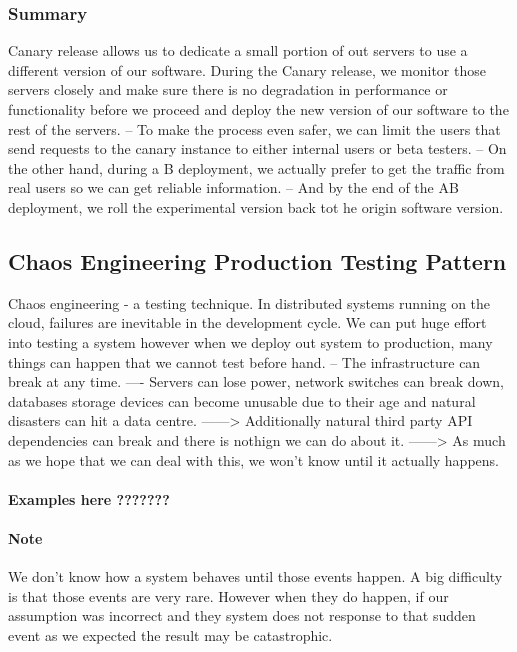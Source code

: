 \documentclass[a4paper, 11pt]{book}
\begin{document}
    \subsubsection{Summary}
    Canary release allows us to dedicate a small portion of out servers to use a different version of our software.
    During the Canary release, we monitor those servers closely and make sure there is no degradation in performance or functionality before we proceed and deploy the new version of our software to the rest of the servers.
    -- To make the process even safer, we can limit the users that send requests to the canary instance to either internal users or beta testers.
    -- On the other hand, during a B deployment, we actually prefer to get the traffic from real users so we can get reliable information.
    -- And by the end of the AB deployment, we roll the experimental version back tot he origin software version.

    \subsection{Chaos Engineering Production Testing Pattern}
    Chaos engineering - a testing technique.
    In distributed systems running on the cloud, failures are inevitable in the development cycle.
    We can put huge effort into testing a system however when we deploy out system to production, many things can happen that we cannot test before hand.
    -- The infrastructure can break at any time.
    ---- Servers can lose power, network switches can break down, databases storage devices can become unusable due to their age and natural disasters can hit a data centre.
    ------> Additionally natural third party API dependencies can break and there is nothign we can do about it.
    ------> As much as we hope that we can deal with this, we won't know until it actually happens.

    \paragraph{Examples here ???????}

    \paragraph{Note}
    We don't know how a system behaves until those events happen.
    A big difficulty is that those events are very rare.
    However when they do happen, if our assumption was incorrect and they system does not response to that sudden event as we expected the result may be catastrophic.
\end{document}
